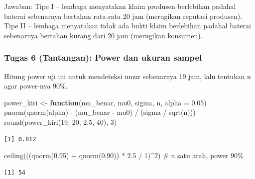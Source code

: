\documentclass[
  indonesian,
  letterpaper,
]{book}
\newenvironment{Shaded}{\begin{snugshade}}{\end{snugshade}}
\newcommand{\AttributeTok}[1]{\textcolor[rgb]{0.40,0.45,0.13}{#1}}
\newcommand{\CommentTok}[1]{\textcolor[rgb]{0.37,0.37,0.37}{#1}}
\newcommand{\ControlFlowTok}[1]{\textcolor[rgb]{0.00,0.23,0.31}{\textbf{#1}}}
\newcommand{\DecValTok}[1]{\textcolor[rgb]{0.68,0.00,0.00}{#1}}
\newcommand{\FloatTok}[1]{\textcolor[rgb]{0.68,0.00,0.00}{#1}}
\newcommand{\FunctionTok}[1]{\textcolor[rgb]{0.28,0.35,0.67}{#1}}
\newcommand{\NormalTok}[1]{\textcolor[rgb]{0.00,0.23,0.31}{#1}}
\newcommand{\OtherTok}[1]{\textcolor[rgb]{0.00,0.23,0.31}{#1}}
\newcommand{\SpecialCharTok}[1]{\textcolor[rgb]{0.37,0.37,0.37}{#1}}
\begin{document}
Jawaban: Tipe I -- lembaga menyatakan klaim produsen berlebihan padahal
baterai sebenarnya bertahan rata-rata 20 jam (merugikan reputasi
produsen). Tipe II -- lembaga menyatakan tidak ada bukti klaim
berlebihan padahal baterai sebenarnya bertahan kurang dari 20 jam
(merugikan konsumen).

\subsubsection{Tugas 6 (Tantangan): Power dan ukuran
sampel}\label{tugas-6-tantangan-power-dan-ukuran-sampel}

Hitung power uji ini untuk mendeteksi umur sebenarnya 19 jam, lalu
tentukan n agar power-nya 90\%.

\begin{Shaded}
\begin{Highlighting}[]
\NormalTok{power\_kiri }\OtherTok{\textless{}{-}} \ControlFlowTok{function}\NormalTok{(mu\_benar, mu0, sigma, n, }\AttributeTok{alpha =} \FloatTok{0.05}\NormalTok{)}
\FunctionTok{pnorm}\NormalTok{(}\FunctionTok{qnorm}\NormalTok{(alpha) }\SpecialCharTok{{-}}\NormalTok{ (mu\_benar }\SpecialCharTok{{-}}\NormalTok{ mu0) }\SpecialCharTok{/}\NormalTok{ (sigma }\SpecialCharTok{/} \FunctionTok{sqrt}\NormalTok{(n)))}
\FunctionTok{round}\NormalTok{(}\FunctionTok{power\_kiri}\NormalTok{(}\DecValTok{19}\NormalTok{, }\DecValTok{20}\NormalTok{, }\FloatTok{2.5}\NormalTok{, }\DecValTok{40}\NormalTok{), }\DecValTok{3}\NormalTok{)}
\end{Highlighting}
\end{Shaded}

\begin{verbatim}
[1] 0.812
\end{verbatim}

\begin{Shaded}
\begin{Highlighting}[]
\FunctionTok{ceiling}\NormalTok{(((}\FunctionTok{qnorm}\NormalTok{(}\FloatTok{0.95}\NormalTok{) }\SpecialCharTok{+} \FunctionTok{qnorm}\NormalTok{(}\FloatTok{0.90}\NormalTok{)) }\SpecialCharTok{*} \FloatTok{2.5} \SpecialCharTok{/} \DecValTok{1}\NormalTok{)}\SpecialCharTok{\^{}}\DecValTok{2}\NormalTok{) }\CommentTok{\# n satu arah, power 90\%}
\end{Highlighting}
\end{Shaded}

\begin{verbatim}
[1] 54
\end{verbatim}
\end{document}
